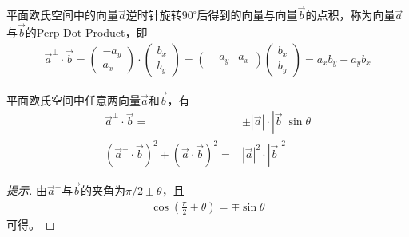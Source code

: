 \begin{definition}
  平面欧氏空间中的向量$\vec a$逆时针旋转$90^\circ$后得到的向量与向量$\vec b$的点积，称为向量$\vec a$与$\vec b$的Perp Dot Product，即
  \begin{align*}
    \vec a^\perp \cdot \vec b =
    \begin{pmatrix}
      -a_y\\ a_x
    \end{pmatrix} \cdot
    \begin{pmatrix}
      b_x\\ b_y
    \end{pmatrix} =
    \begin{pmatrix}
      -a_y & a_x
    \end{pmatrix}
    \begin{pmatrix}
      b_x\\ b_y
    \end{pmatrix} =
    a_xb_y - a_yb_x
  \end{align*}
\end{definition}

\begin{theorem}
  平面欧氏空间中任意两向量$\vec a$和$\vec b$，有
  \begin{align*}
    \vec a^\perp\cdot \vec b={}&\pm \left|\vec a\right|\cdot\left|\vec b\right|\sin\theta\\
    \left(\vec a^\perp\cdot \vec b\right)^2 + \left(\vec a\cdot\vec b\right)^2 ={}& \left|\vec a\right|^2 \cdot \left|\vec b\right|^2
  \end{align*}
\end{theorem}
\begin{proof}[提示]
  由$\vec a^\perp$与$\vec b$的夹角为$\pi/2 \pm \theta$，且
  \begin{align*}
    \cos\left(\frac\pi2\pm\theta\right)=\mp\sin\theta
  \end{align*}
  可得。
\end{proof}


